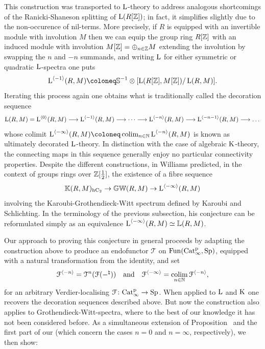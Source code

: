 This construction was transported to $\operatorname L$-theory to address analogous shortcomings of the Ranicki-Shaneson splitting of $\operatorname L(R[\mathbb Z])$; in fact, it simplifies slightly due to the non-occurence of nil-terms. More precisely, if $R$ is equipped with an invertible module with involution $M$ then we can equip the group ring $R[\mathbb{Z}]$ with an induced module with involution $M[\mathbb{Z}] = \oplus_{n \in \mathbb{Z}} M$ extending the involution by swapping the $n$ and $-n$ summands, and writing $\operatorname L$ for either symmetric or quadratic $\operatorname L$-spectra one puts
\[
\L^{\cotower{-1}}(R,M) \coloneq \SS^{-1} \otimes [\L(R[\ZZ],M[\ZZ])/\L(R,M)].
\]
Iterating this process again one obtains what is traditionally called the decoration sequence
\[
\operatorname L(R,M) = \operatorname L^{\langle 0\rangle}(R,M) \longrightarrow \operatorname L^{\langle -1 \rangle}(R,M) \longrightarrow \dots \longrightarrow \operatorname L^{\langle -n\rangle}(R,M) \longrightarrow \operatorname L^{\langle -n-1 \rangle}(R,M) \longrightarrow \dots
\]
whose colimit 
$
\L^{\cotower{-\infty}}(R,M) \coloneq \colim_{n \in \mathbb N} \L^{\cotower{-n}}(R,M)
$
is known as ultimately decorated $\operatorname L$-theory. In distinction with the case of algebraic $\operatorname K$-theory, the connecting maps in this sequence generally enjoy no particular connectivity properties. 
Despite the different constructions, in \cite{williams-quadratic} Williams predicted, in the context of groups rings over $\mathbb{Z}[\tfrac{1}{2}]$, the existence of a fibre sequence
\[
\mathbb K(R,M)_{{\mathrm{h}\mathrm{C_2}}} \to \mathbb{GW}(R,M) \to \operatorname L^{\langle -\infty \rangle}(R,M)
\]
involving the Karoubi-Grothendieck-Witt spectrum defined by Karoubi and Schlichting.
In the terminology of the previous subsection, his conjecture can be reformulated simply as an equivalence $\operatorname L^{\langle -\infty \rangle}(R,M) \simeq \mathbb{L}(R,M)$.


Our approach to proving this conjecture in general proceeds by adapting the construction above to produce an endofunctor $\mathcal T$ on $\operatorname{Fun}(\mathrm{Cat}^{\mathrm p}_\infty,\mathrm{Sp})$, equipped with a natural transformation from the identity, and set
\[
\mathcal{F}^{\langle -n \rangle} = \mathcal T^n(\mathcal F(-^\natural)) \quad \text{and} \quad \mathcal{F}^{\langle -\infty \rangle} = \mathop{\mathrm{colim}}_{n \in \mathbb N} \mathcal{F}^{\langle -n \rangle},
\]
for an arbitrary Verdier-localising $\mathcal{F} \colon \mathrm{Cat}^{\mathrm p}_\infty \rightarrow \mathrm{Sp}$. When applied to $\operatorname L$ and $\operatorname K$ one recovers the decoration sequences described above.
But now the construction also applies to Grothendieck-Witt-spectra, where to the best of our knowledge it has not been considered before. As a simultaneous extension of Proposition~  and the first part of our  (which concern the cases $n=0$ and $n=\infty$, respectively), we then show:

